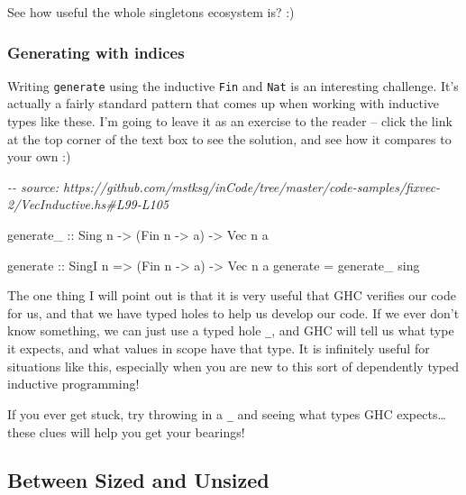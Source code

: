 \documentclass[]{article}
\newenvironment{Shaded}{}{}
\newcommand{\CommentTok}[1]{\textcolor[rgb]{0.38,0.63,0.69}{\textit{#1}}}
\newcommand{\DataTypeTok}[1]{\textcolor[rgb]{0.56,0.13,0.00}{#1}}
\newcommand{\NormalTok}[1]{#1}
\newcommand{\OtherTok}[1]{\textcolor[rgb]{0.00,0.44,0.13}{#1}}
\begin{document}
See how useful the whole singletons ecosystem is? :)

\subsubsection{Generating with indices}\label{generating-with-indices-1}

Writing \texttt{generate} using the inductive \texttt{Fin} and \texttt{Nat} is
an interesting challenge. It's actually a fairly standard pattern that comes up
when working with inductive types like these. I'm going to leave it as an
exercise to the reader -- click the link at the top corner of the text box to
see the solution, and see how it compares to your own :)

\begin{Shaded}
\begin{Highlighting}[]
\CommentTok{{-}{-} source: https://github.com/mstksg/inCode/tree/master/code{-}samples/fixvec{-}2/VecInductive.hs\#L99{-}L105}

\OtherTok{generate\_ ::} \DataTypeTok{Sing}\NormalTok{ n }\OtherTok{{-}\textgreater{}}\NormalTok{ (}\DataTypeTok{Fin}\NormalTok{ n }\OtherTok{{-}\textgreater{}}\NormalTok{ a) }\OtherTok{{-}\textgreater{}} \DataTypeTok{Vec}\NormalTok{ n a}

\OtherTok{generate ::} \DataTypeTok{SingI}\NormalTok{ n }\OtherTok{=\textgreater{}}\NormalTok{ (}\DataTypeTok{Fin}\NormalTok{ n }\OtherTok{{-}\textgreater{}}\NormalTok{ a) }\OtherTok{{-}\textgreater{}} \DataTypeTok{Vec}\NormalTok{ n a}
\NormalTok{generate }\OtherTok{=}\NormalTok{ generate\_ sing}
\end{Highlighting}
\end{Shaded}

The one thing I will point out is that it is very useful that GHC verifies our
code for us, and that we have typed holes to help us develop our code. If we
ever don't know something, we can just use a typed hole \texttt{\_}, and GHC
will tell us what type it expects, and what values in scope have that type. It
is infinitely useful for situations like this, especially when you are new to
this sort of dependently typed inductive programming!

If you ever get stuck, try throwing in a \texttt{\_} and seeing what types GHC
expects\ldots these clues will help you get your bearings!

\subsection{Between Sized and Unsized}\label{between-sized-and-unsized}
\end{document}
